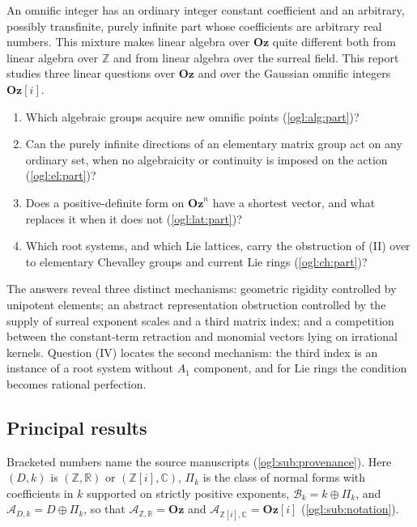 \documentclass[11pt,oneside]{article}
\numberwithin{equation}{section}
\theoremstyle{definition}
\theoremstyle{remark}
\newcommand{\Oz}{\mathbf{Oz}}
\newcommand{\GOz}{\mathbf{Oz}[i]}
\newcommand{\Z}{\mathbb Z}
\newcommand{\R}{\mathbb R}
\newcommand{\C}{\mathbb C}
\newcommand{\A}{\mathcal A}
\newcommand{\Bk}{\mathcal B_k}
\begin{document}
An omnific integer has an ordinary integer constant coefficient and an
arbitrary, possibly transfinite, purely infinite part whose coefficients are
arbitrary real numbers. This mixture makes linear algebra over $\Oz$ quite
different both from linear algebra over $\Z$ and from linear algebra over the
surreal field. This report studies three linear questions over $\Oz$ and over
the Gaussian omnific integers $\GOz$.
\begin{enumerate}[label=(\Roman*),leftmargin=*]
\item Which algebraic groups acquire new omnific points
(\cref{ogl:alg:part})?
\item Can the purely infinite directions of an elementary matrix group act on
any ordinary set, when no algebraicity or continuity is imposed on the action
(\cref{ogl:el:part})?
\item Does a positive-definite form on $\Oz^n$ have a shortest vector, and
what replaces it when it does not (\cref{ogl:lat:part})?
\item Which root systems, and which Lie lattices, carry the obstruction of (II)
over to elementary Chevalley groups and current Lie rings
(\cref{ogl:ch:part})?
\end{enumerate}
The answers reveal three distinct mechanisms: geometric rigidity controlled by
unipotent elements; an abstract representation obstruction controlled by the
supply of surreal exponent scales and a third matrix index; and a competition
between the constant-term retraction and monomial vectors lying on irrational
kernels. Question (IV) locates the second mechanism: the third index is an
instance of a root system without $A_1$ component, and for Lie rings the
condition becomes rational perfection.

\subsection{Principal results}\label{ogl:sub:results}

Bracketed numbers name the source manuscripts (\cref{ogl:sub:provenance}).
Here $(D,k)$ is $(\Z,\R)$ or $(\Z[i],\C)$, $\Pi_k$ is the class of normal
forms with coefficients in $k$ supported on strictly positive exponents,
$\Bk=k\oplus\Pi_k$, and $\A_{D,k}=D\oplus\Pi_k$, so that $\A_{\Z,\R}=\Oz$ and
$\A_{\Z[i],\C}=\GOz$ (\cref{ogl:sub:notation}).
\end{document}
